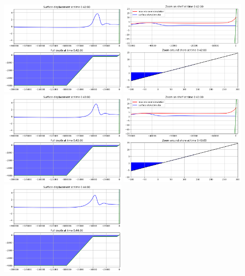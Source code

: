 \documentclass[11pt]{article}
\begin{document}
\vskip 10pt 
\includegraphics[width=0.475\textwidth]{frame0042fig0.png}
\includegraphics[width=0.475\textwidth]{frame0042fig1.png}
\vskip 10pt 
\includegraphics[width=0.475\textwidth]{frame0043fig0.png}
\includegraphics[width=0.475\textwidth]{frame0043fig1.png}
\vskip 10pt 
\includegraphics[width=0.475\textwidth]{frame0044fig0.png}
\end{document}
